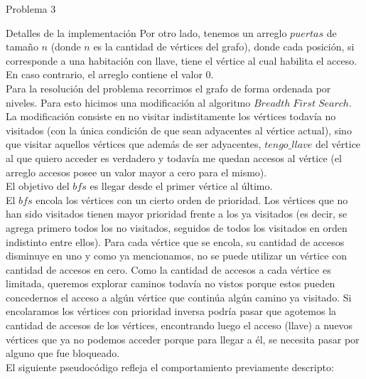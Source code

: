 \begin{section}{Problema 3}
\begin{subsection}{Detalles de la implementación}
		Por otro lado, tenemos un arreglo $puertas$ de tamaño $n$ (donde $n$ es la cantidad de vértices del grafo), donde cada posición, si corresponde a una habitación con llave, tiene el vértice al cual habilita el acceso. En caso contrario, el arreglo contiene el valor $0$.\\

		Para la resolución del problema recorrimos el grafo de forma ordenada por niveles. Para esto hicimos una modificación al algoritmo $Breadth\; First\; Search$. La modificación consiste en no visitar indistitamente los vértices todavía no visitados (con la única condición de que sean adyacentes al vértice actual), sino que visitar aquellos vértices que además de ser adyacentes, $tengo\_llave$ del vértice al que quiero acceder es verdadero y todavía me quedan accesos al vértice (el arreglo accesos posee un valor mayor a cero para el mismo).\\

		El objetivo del $bfs$ es llegar desde el primer vértice al último.\\

		El $bfs$ encola los vértices con un cierto orden de prioridad. Los vértices que no han sido visitados tienen mayor prioridad frente a los ya visitados (es decir, se agrega primero todos los no visitados, seguidos de todos los visitados en orden indistinto entre ellos). Para cada vértice que se encola, su cantidad de accesos disminuye en uno y como ya mencionamos, no se puede utilizar un vértice con cantidad de accesos en cero. Como la cantidad de accesos a cada vértice es limitada, queremos explorar caminos todavía no vistos porque estos pueden concedernos el acceso a algún vértice que continúa algún camino ya visitado. Si encolaramos los vértices con prioridad inversa podría pasar que agotemos la cantidad de accesos de los vértices, encontrando luego el acceso (llave) a nuevos vértices que ya no podemos acceder porque para llegar a él, se necesita pasar por alguno que fue bloqueado.\\

		El siguiente pseudocódigo refleja el comportamiento previamente descripto:\\


\end{subsection}
\end{section}
